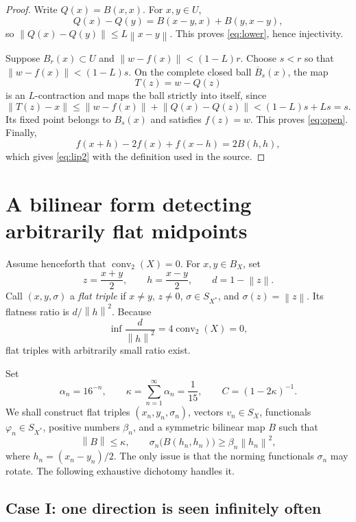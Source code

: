 \documentclass[11pt]{article}
\newcommand{\norm}[1]{\left\lVert #1\right\rVert}
\newcommand{\BX}{B_X}
\newcommand{\SX}{S_X}
\begin{document}
\begin{proof}
Write $Q(x)=B(x,x)$.  For $x,y\in U$,
\[
 Q(x)-Q(y)=B(x-y,x)+B(y,x-y),
\]
so $\norm{Q(x)-Q(y)}\leq L\norm{x-y}$.  This proves
\eqref{eq:lower}, hence injectivity.

Suppose $B_r(x)\subset U$ and
$\norm{w-f(x)}<(1-L)r$.  Choose $s<r$ so that
$\norm{w-f(x)}<(1-L)s$.  On the complete closed ball
$\overline B_s(x)$, the map
\[
                         T(z)=w-Q(z)
\]
is an $L$-contraction and maps the ball strictly into itself, since
\[
 \norm{T(z)-x}
 \leq\norm{w-f(x)}+\norm{Q(x)-Q(z)}< (1-L)s+Ls=s.
\]
Its fixed point belongs to $B_s(x)$ and satisfies $f(z)=w$.  This proves
\eqref{eq:open}.  Finally,
\[
 f(x+h)-2f(x)+f(x-h)=2B(h,h),
\]
which gives \eqref{eq:lip2} with the definition used in the source.
\end{proof}

\section{A bilinear form detecting arbitrarily flat midpoints}

Assume henceforth that $\operatorname{conv}_2(X)=0$.  For
$x,y\in\BX$, set
\[
             z=\frac{x+y}{2},\qquad h=\frac{x-y}{2},\qquad
             d=1-\norm{z}.
\]
Call $(x,y,\sigma)$ a \emph{flat triple} if $x\ne y$, $z\ne0$,
$\sigma\in S_{X^*}$, and $\sigma(z)=\norm{z}$.  Its flatness ratio is
$d/\norm{h}^2$.  Because
\[
 \inf\frac{d}{\norm{h}^2}=4\operatorname{conv}_2(X)=0,
\]
flat triples with arbitrarily small ratio exist.

Set
\[
       \alpha_n=16^{-n},\qquad
       \kappa=\sum_{n=1}^\infty\alpha_n=\frac1{15},\qquad
       C=(1-2\kappa)^{-1}.
\]
We shall construct flat triples $(x_n,y_n,\sigma_n)$, vectors
$v_n\in\SX$, functionals $\varphi_n\in S_{X^*}$, positive numbers
$\beta_n$, and a symmetric bilinear map $B$ such that
\begin{equation}\label{eq:detection}
 \norm{B}\leq\kappa,
 \qquad
 \sigma_n\bigl(B(h_n,h_n)\bigr)
       \geq\beta_n\norm{h_n}^2,
\end{equation}
where $h_n=(x_n-y_n)/2$.  The only issue is that the norming functionals
$\sigma_n$ may rotate.  The following exhaustive dichotomy handles it.

\subsection*{Case I: one direction is seen infinitely often}
\end{document}
